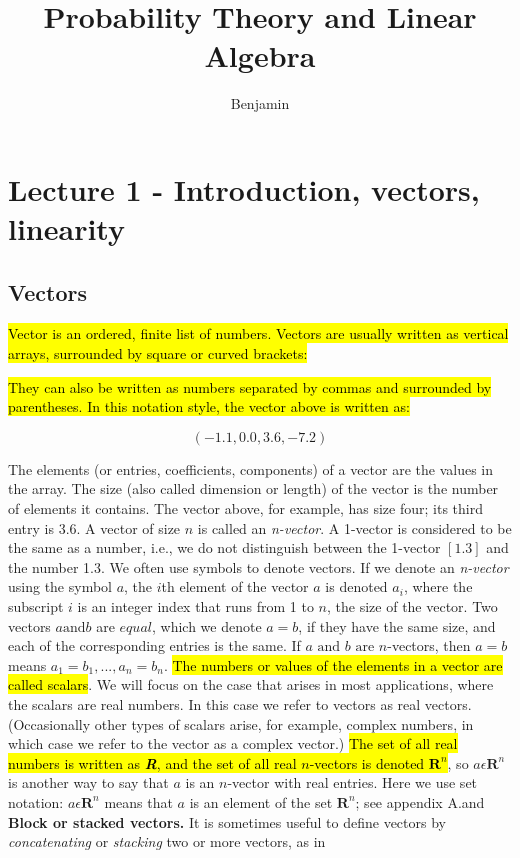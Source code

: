 \documentclass[11pt,oneside,a4paper,openright]{article}
\title{Probability Theory and Linear Algebra}
\author{Benjamin}
\begin{document}
\maketitle
\section*{Lecture 1 - Introduction, vectors, linearity} 
\subsection*{Vectors}

\hl{Vector is an ordered, finite list of numbers. Vectors are usually written as vertical arrays, surrounded by square or curved brackets:}

\hl{They can also be written as numbers separated by commas and surrounded by parentheses. In this notation style, the vector above is written as: }

\begin{equation}
	(-1.1, 0.0, 3.6, -7.2)
\end{equation}

The elements (or entries, coefficients, components) of a vector are the values in the array. The size (also called dimension or length) of the vector is the number of
elements it contains. The vector above, for example, has size four; its third entry is 3.6. A vector of size $n$ is called an \emph{n-vector}. A 1-vector is considered to be the
same as a number, i.e., we do not distinguish between the 1-vector $[ 1.3 ]$ and the number 1.3.
\newline 
We often use symbols to denote vectors. If we denote an \emph{n-vector} using the symbol $a$, the $i$th element of the vector $a$ is denoted $a_i$, where the subscript $i$ is an integer index that runs from 1 to $n$, the size of the vector.
Two vectors $a \text{and} b$ are $equal$, which we denote $a = b$, if they have the same size, and each of the corresponding entries is the same. If $a \text{ and } b \text{ are } n$-vectors, then $a = b$ means $a_1 = b_1, . . . , a_n = b_n$.
\newline 
\hl{The numbers or values of the elements in a vector are called scalars}. We will focus on the case that arises in most applications, where the scalars are real numbers. In this case we refer to vectors as real vectors. (Occasionally other types of scalars arise, for example, complex numbers, in which case we refer to the vector as a complex vector.) \hl{The set of all real numbers is written as \textbf{\textit{R}}, and the set of all real $n$-vectors is denoted $\textbf{R}^n$}, so $a \epsilon \textbf{R}^n$ is another way to say that $a$ is an $n$-vector with real entries. Here we use set notation: $a \epsilon \textbf{R}^n$ means that $a$ is an element of the set $\textbf{R}^n$; see appendix A.and
\newline 
\textbf{Block or stacked vectors.} It is sometimes useful to define vectors by \emph{concatenating} or \emph{stacking} two or more vectors, as in
\end{document}

